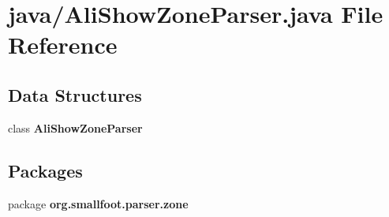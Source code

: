 \section{java/\-Ali\-Show\-Zone\-Parser.java File Reference}
\label{AliShowZoneParser_8java}
\subsection*{Data Structures}
\begin{DoxyCompactItemize}
\item 
class {\bf Ali\-Show\-Zone\-Parser}
\end{DoxyCompactItemize}
\subsection*{Packages}
\begin{DoxyCompactItemize}
\item 
package {\bf org.\-smallfoot.\-parser.\-zone}
\end{DoxyCompactItemize}
